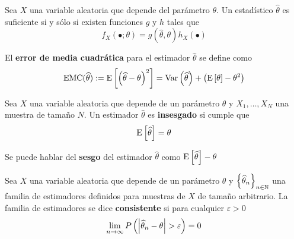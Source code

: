 \begin{teorema}
Sea $X$ una variable aleatoria que depende del parámetro $\theta$. Un estadístico $\widehat{\theta}$ es suficiente si y sólo si existen funciones $g$ y $h$ tales que
\begin{equation}
f_X(\bullet; \theta ) = g(\widehat{\theta},\theta) h_X(\bullet)
\end{equation}
\end{teorema}




\begin{definicion}
El \textbf{error de media cuadrática} para el estimador $\widehat{\theta}$ se define como
\begin{equation}
\text{EMC}(\widehat{\theta}) := \mathrm{E}\left[ \left( \widehat{\theta} - \theta \right)^{2} \right] =
\mathrm{Var}\left( \widehat{\theta} \right) + \left( \mathrm{E}\left[ \theta \right] - \theta^{2} \right)
\end{equation}
\end{definicion}

\begin{definicion}
Sea $X$ una variable aleatoria que depende de un parámetro $\theta$ y $X_1, \dots, X_N$ una muestra de tamaño $N$. Un estimador $\widehat{\theta}$ es \textbf{insesgado} si cumple que
\begin{equation}
\mathrm{E}\left[ \widehat{\theta} \right] = \theta
\end{equation}
\end{definicion}

Se puede hablar del \textbf{sesgo} del estimador $\widehat{\theta}$ como $\mathrm{E}\left[ \widehat{\theta} \right]-\theta$

\begin{definicion}
Sea $X$ una variable aleatoria que depende de un parámetro $\theta$ y $\left\{ \widehat{\theta}_n \right\}_{n\in \mathbb{N}}$ una familia de estimadores definidos para muestras de $X$ de tamaño arbitrario. La familia de estimadores se dice \textbf{consistente} si para cualquier $\varepsilon > 0$
\begin{equation}
\lim_{n\rightarrow\infty} P\left( \left| \widehat{\theta}_n-\theta \right| > \varepsilon \right) = 0
\end{equation}
\end{definicion}

